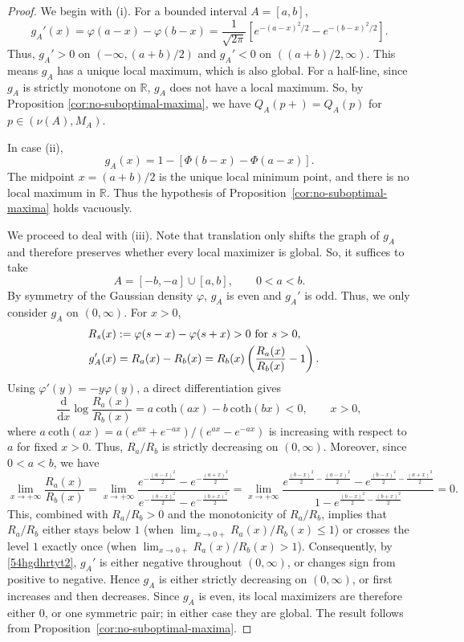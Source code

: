 \documentclass[a4paper, 11pt]{article}
\newcommand{\1}{\mathbf 1}
\theoremstyle{plain}
\begin{document}
\begin{proof}
We begin with (i). For a bounded interval \(A=[a,b]\),
\[
  g_A'(x)=\varphi(a-x)-\varphi(b-x)=\frac{1}{\sqrt{2\pi}}\left[e^{-(a-x)^2/2}-e^{-(b-x)^2/2}\right].
\]
Thus, \(g_A'>0\) on \(( -\infty,(a+b)/2)\) and
\(g_A'<0\) on \(((a+b)/2,\infty)\). This means \(g_A\) has a unique local maximum, which is also global. For a half-line, since \(g_A\) is strictly monotone on $\mathbb{R}$, \(g_A\) does not have a local maximum. So, by Proposition \ref{cor:no-suboptimal-maxima}, we have
\(Q_A(p+)=Q_A(p)\) for \(p\in(\nu(A),M_A)\).
\par
In case \textup{(ii)},
\[
  g_A(x)=1-[\Phi(b-x)-\Phi(a-x)].
\]
The midpoint \(x=(a+b)/2\) is the unique local minimum point, and there is no local
maximum in \(\mathbb{R}\). Thus the hypothesis of
Proposition~\ref{cor:no-suboptimal-maxima} holds vacuously.
\par
We proceed to deal with (iii). Note that translation only shifts the graph of \(g_A\) and therefore preserves whether every local maximizer is global. So, it suffices to take
  \[
    A=[-b,-a]\cup[a,b],
    \qquad 0<a<b.
\]
By symmetry of the Gaussian density $\varphi$, \(g_A\) is even and \(g_A'\) is odd. Thus, we only consider $g_A$ on $(0,\infty)$. For \(x>0\),
\begin{align}\label{54hgdhrtyt2}
R_s(x)&:=\varphi(s-x)-\varphi(s+x)>0{~\text{for}~s>0},\cr
  g_A'(x)&=R_a(x)-R_b(x)=R_b(x)\left(\frac{R_a(x)}{R_b(x)}-1\right).
\end{align}
Using \(\varphi'(y)=-y\varphi(y)\), a direct differentiation gives
\[
  \frac{\mathrm{d}}{\mathrm{d} x}\log\frac{R_a(x)}{R_b(x)}=a~\text{coth}(ax)-b~\text{coth}(bx)<0,
  \qquad x>0,
\]
where $a~\text{coth}(ax)=a{(e^{ax}+e^{-ax})/}{(e^{ax}-e^{-ax})}$ is increasing with respect to $a$ for fixed $x>0$.
Thus, \(R_a/R_b\) is strictly decreasing on $(0,\infty)$. Moreover, since $0<a<b$, we have
$$
\lim_{x\to+\infty}\frac{R_a(x)}{R_b(x)}=\lim_{x\to+\infty}\frac{e^{-\frac{(a-x)^2}{2}}-e^{-\frac{(a+x)^2}{2}}
}{e^{-\frac{(b-x)^2}{2}}-e^{-\frac{(b+x)^2}{2}}}=\lim_{x\to+\infty}\frac{e^{\frac{(b-x)^2}{2}-\frac{(a-x)^2}{2}}-e^{\frac{(b-x)^2}{2}-\frac{(a+x)^2}{2}}
}{1-e^{\frac{(b-x)^2}{2}-\frac{(b+x)^2}{2}}}=0.
$$
This, combined with \(R_a/R_b>0\) and the monotonicity of \(R_a/R_b\), implies that $R_a/R_b$ either stays below $1$ (when $\lim_{x\to0+}R_a(x)/R_b(x)
\leq1$) or crosses the level $1$ exactly once (when $\lim_{x\to0+}R_a(x)/R_b(x)>1$). Consequently, by \eqref{54hgdhrtyt2}, \(g_A'\) is either negative throughout
\((0,\infty)\), or
changes sign from positive to negative. Hence \(g_A\)
is either strictly decreasing on \((0,\infty)\), or first increases and
then decreases. Since \(g_A\) is even, its local maximizers are therefore
either \(0\), or one symmetric pair; in either case they are global.
The result follows from Proposition~\ref{cor:no-suboptimal-maxima}.
\end{proof}
\end{document}
